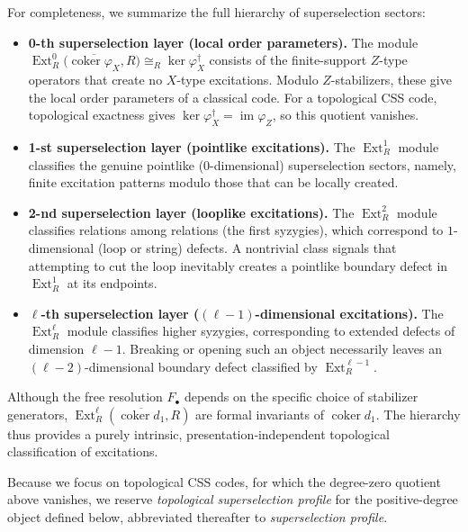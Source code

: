 \documentclass[aps,prx,english,superscriptaddress,twocolumn,tightenlines,showpacs,longbibliography,floatfix,amsfonts]{revtex4-2}
\theoremstyle{remark}
\theoremstyle{definition}
\begin{document}
For completeness, we summarize the full hierarchy of superselection sectors:
\begin{itemize}
	\item \textbf{0-th superselection layer (local order parameters).}
	The module
	\(
	\operatorname{Ext}_R^0
	\bigl(\overline{\operatorname{coker}\varphi_X},R\bigr)
	\cong_R\ker\varphi_X^\dagger
	\)
	consists of the finite-support \(Z\)-type operators that create no
	\(X\)-type excitations. Modulo \(Z\)-stabilizers, these give the local
	order parameters of a classical code. For a topological CSS code,
	topological exactness gives
	\(\ker\varphi_X^\dagger=\operatorname{im}\varphi_Z\), so this quotient
	vanishes.

	\item \textbf{1-st superselection layer (pointlike excitations).} The $\operatorname{Ext}_R^1$ module classifies the genuine pointlike ($0$-dimensional) superselection sectors, namely, finite excitation patterns modulo those that can be locally created.

	\item \textbf{2-nd superselection layer (looplike excitations).} The $\operatorname{Ext}_R^2$ module classifies relations among relations (the first syzygies), which correspond to $1$-dimensional (loop or string) defects. A nontrivial class signals that attempting to cut the loop inevitably creates a pointlike boundary defect in $\operatorname{Ext}_R^1$ at its endpoints.

	\item \textbf{\(\ell\)-th superselection layer ($(\ell-1)$-dimensional excitations).} The $\operatorname{Ext}_R^\ell$ module classifies higher syzygies, corresponding to extended defects of dimension $\ell-1$. Breaking or opening such an object necessarily leaves an $(\ell-2)$-dimensional boundary defect classified by $\operatorname{Ext}_R^{\ell-1}$.
\end{itemize}

Although the free resolution $F_\bullet$ depends on the specific choice of stabilizer generators, $\operatorname{Ext}_R^\ell(\overline{\operatorname{coker}d_1}, R)$ are formal invariants of $\operatorname{coker}d_1$. The hierarchy thus provides a purely intrinsic, presentation‑independent topological classification of excitations.

Because we focus on topological CSS codes, for which the degree-zero quotient
above vanishes, we reserve \emph{topological superselection profile} for the
positive-degree object defined below, abbreviated thereafter to
\emph{superselection profile}.
\end{document}
